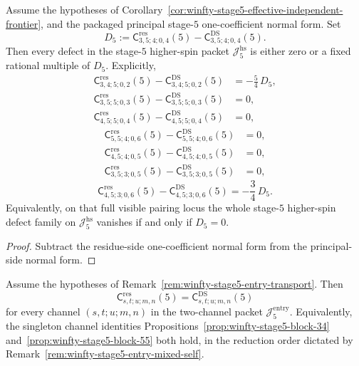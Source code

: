 \begin{corollary}
\label{cor:winfty-stage5-one-defect-family}
\ClaimStatusConditional
Assume the hypotheses of
Corollary~\ref{cor:winfty-stage5-effective-independent-frontier},
and
the packaged principal stage-$5$ one-coefficient normal form.
Set
\[
D_5:=
\mathsf{C}^{\mathrm{res}}_{3,5;4;0,4}(5)
-
\mathsf{C}^{\mathrm{DS}}_{3,5;4;0,4}(5).
\]
Then every defect in the stage-$5$ higher-spin packet
\(\mathcal{J}_5^{\mathrm{hs}}\) is either zero or a fixed rational
multiple of \(D_5\). Explicitly,
\[
\begin{aligned}
\mathsf{C}^{\mathrm{res}}_{3,4;5;0,2}(5)
-
\mathsf{C}^{\mathrm{DS}}_{3,4;5;0,2}(5)
&=
-\frac{5}{4}\,D_5,\\
\mathsf{C}^{\mathrm{res}}_{3,5;5;0,3}(5)
-
\mathsf{C}^{\mathrm{DS}}_{3,5;5;0,3}(5)
&=0,\\
\mathsf{C}^{\mathrm{res}}_{4,5;5;0,4}(5)
-
\mathsf{C}^{\mathrm{DS}}_{4,5;5;0,4}(5)
&=0,
\end{aligned}
\]
\[
\begin{aligned}
\mathsf{C}^{\mathrm{res}}_{5,5;4;0,6}(5)
-
\mathsf{C}^{\mathrm{DS}}_{5,5;4;0,6}(5)
&=0,\\
\mathsf{C}^{\mathrm{res}}_{4,5;4;0,5}(5)
-
\mathsf{C}^{\mathrm{DS}}_{4,5;4;0,5}(5)
&=0,\\
\mathsf{C}^{\mathrm{res}}_{3,5;3;0,5}(5)
-
\mathsf{C}^{\mathrm{DS}}_{3,5;3;0,5}(5)
&=0,
\end{aligned}
\]
\[
\mathsf{C}^{\mathrm{res}}_{4,5;3;0,6}(5)
-
\mathsf{C}^{\mathrm{DS}}_{4,5;3;0,6}(5)
=
-\frac{3}{4}\,D_5.
\]
Equivalently, on that full visible pairing locus the whole stage-$5$
higher-spin defect family on \(\mathcal{J}_5^{\mathrm{hs}}\) vanishes
if and only if \(D_5=0\).
\end{corollary}

\begin{proof}
Subtract the residue-side one-coefficient normal form from the principal-side normal form.
\end{proof}

\begin{proposition}
\label{prop:winfty-stage5-entry-identities}
\ClaimStatusConditional{}
Assume the hypotheses of
Remark~\ref{rem:winfty-stage5-entry-transport}. Then
\[
\mathsf{C}^{\mathrm{res}}_{s,t;u;m,n}(5)
=
\mathsf{C}^{\mathrm{DS}}_{s,t;u;m,n}(5)
\]
for every channel $(s,t;u;m,n)$ in the two-channel packet
$\mathcal{J}_5^{\mathrm{entry}}$. Equivalently, the singleton channel
identities
Propositions~\ref{prop:winfty-stage5-block-34}
and~\ref{prop:winfty-stage5-block-55}
both hold, in the reduction order dictated by
Remark~\ref{rem:winfty-stage5-entry-mixed-self}.
\end{proposition}

